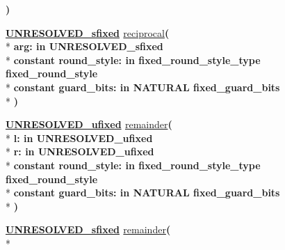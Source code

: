 \begin{DoxyCompactItemize}
{\bfseries  )} 
\item 
{\bfseries {\bfseries {\bfseries \hyperlink{classfixed__pkg_aa723b28a027c3c0f9bca02d75e8df4d6}{U\+N\+R\+E\+S\+O\+L\+V\+E\+D\+\_\+sfixed}} \textcolor{vhdlchar}{ }}} \hyperlink{classfixed__pkg_a2963403e2073870bc4de54dcaca3b371}{reciprocal}{\bfseries  ( }\\*
{\bfseries \textcolor{vhdlchar}{arg\+: }\textcolor{stringliteral}{in }\textcolor{vhdlchar}{U\+N\+R\+E\+S\+O\+L\+V\+E\+D\+\_\+sfixed}}\\*
{\bfseries {\bfseries \textcolor{keywordflow}{constant}\textcolor{vhdlchar}{ }}\textcolor{vhdlchar}{round\+\_\+style\+: }\textcolor{stringliteral}{in }\textcolor{vhdlchar}{fixed\+\_\+round\+\_\+style\+\_\+type     fixed\+\_\+round\+\_\+style}}\\*
{\bfseries {\bfseries \textcolor{keywordflow}{constant}\textcolor{vhdlchar}{ }}\textcolor{vhdlchar}{guard\+\_\+bits\+: }\textcolor{stringliteral}{in }\textcolor{vhdlchar}{N\+A\+T\+U\+R\+A\+L     fixed\+\_\+guard\+\_\+bits}}\\*
{\bfseries  )} 
\item 
{\bfseries {\bfseries {\bfseries \hyperlink{classfixed__pkg_ae78bc2b36d22f6abeac163955e8a587d}{U\+N\+R\+E\+S\+O\+L\+V\+E\+D\+\_\+ufixed}} \textcolor{vhdlchar}{ }}} \hyperlink{classfixed__pkg_a40206b01a0930b7fece3e755b512760a}{remainder}{\bfseries  ( }\\*
{\bfseries \textcolor{vhdlchar}{l\+: }\textcolor{stringliteral}{in }\textcolor{vhdlchar}{U\+N\+R\+E\+S\+O\+L\+V\+E\+D\+\_\+ufixed}}\\*
{\bfseries \textcolor{vhdlchar}{r\+: }\textcolor{stringliteral}{in }\textcolor{vhdlchar}{U\+N\+R\+E\+S\+O\+L\+V\+E\+D\+\_\+ufixed}}\\*
{\bfseries {\bfseries \textcolor{keywordflow}{constant}\textcolor{vhdlchar}{ }}\textcolor{vhdlchar}{round\+\_\+style\+: }\textcolor{stringliteral}{in }\textcolor{vhdlchar}{fixed\+\_\+round\+\_\+style\+\_\+type     fixed\+\_\+round\+\_\+style}}\\*
{\bfseries {\bfseries \textcolor{keywordflow}{constant}\textcolor{vhdlchar}{ }}\textcolor{vhdlchar}{guard\+\_\+bits\+: }\textcolor{stringliteral}{in }\textcolor{vhdlchar}{N\+A\+T\+U\+R\+A\+L     fixed\+\_\+guard\+\_\+bits}}\\*
{\bfseries  )} 
\item 
{\bfseries {\bfseries {\bfseries \hyperlink{classfixed__pkg_aa723b28a027c3c0f9bca02d75e8df4d6}{U\+N\+R\+E\+S\+O\+L\+V\+E\+D\+\_\+sfixed}} \textcolor{vhdlchar}{ }}} \hyperlink{classfixed__pkg_a60e9ec39e9203cde6cec6fed45bf984a}{remainder}{\bfseries  ( }\\*

\end{DoxyCompactItemize}
